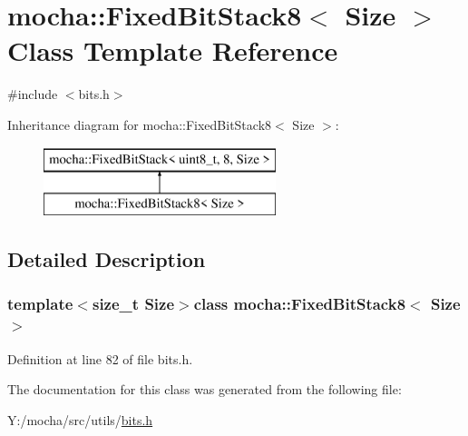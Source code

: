 \hypertarget{classmocha_1_1_fixed_bit_stack8}{
\section{mocha::FixedBitStack8$<$ Size $>$ Class Template Reference}
\label{classmocha_1_1_fixed_bit_stack8}
}


{\ttfamily \#include $<$bits.h$>$}

Inheritance diagram for mocha::FixedBitStack8$<$ Size $>$:\begin{figure}[H]
\begin{center}
\leavevmode
\includegraphics[height=2.000000cm]{classmocha_1_1_fixed_bit_stack8}
\end{center}
\end{figure}


\subsection{Detailed Description}
\subsubsection*{template$<$size\_\-t Size$>$class mocha::FixedBitStack8$<$ Size $>$}



Definition at line 82 of file bits.h.



The documentation for this class was generated from the following file:\begin{DoxyCompactItemize}
\item 
Y:/mocha/src/utils/\hyperlink{bits_8h}{bits.h}\end{DoxyCompactItemize}

